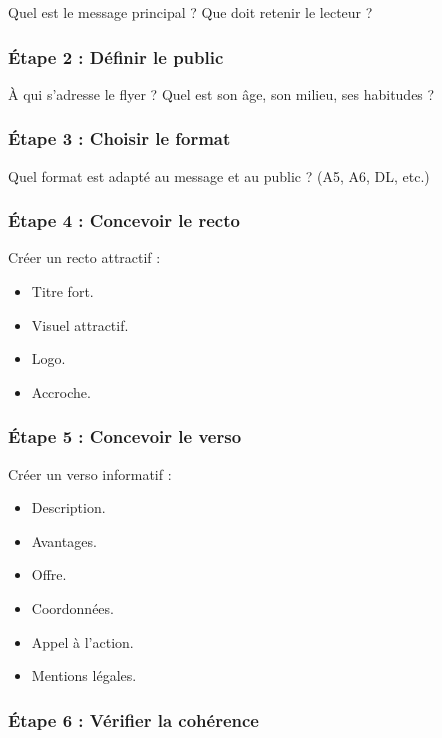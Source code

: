 Quel est le message principal ? Que doit retenir le lecteur ?

\subsubsection{Étape 2 : Définir le public}

À qui s'adresse le flyer ? Quel est son âge, son milieu, ses habitudes ?

\subsubsection{Étape 3 : Choisir le format}

Quel format est adapté au message et au public ? (A5, A6, DL, etc.)

\subsubsection{Étape 4 : Concevoir le recto}

Créer un recto attractif :

\begin{itemize}
    \item Titre fort.
    \item Visuel attractif.
    \item Logo.
    \item Accroche.
\end{itemize}

\subsubsection{Étape 5 : Concevoir le verso}

Créer un verso informatif :

\begin{itemize}
    \item Description.
    \item Avantages.
    \item Offre.
    \item Coordonnées.
    \item Appel à l'action.
    \item Mentions légales.
\end{itemize}

\subsubsection{Étape 6 : Vérifier la cohérence}

